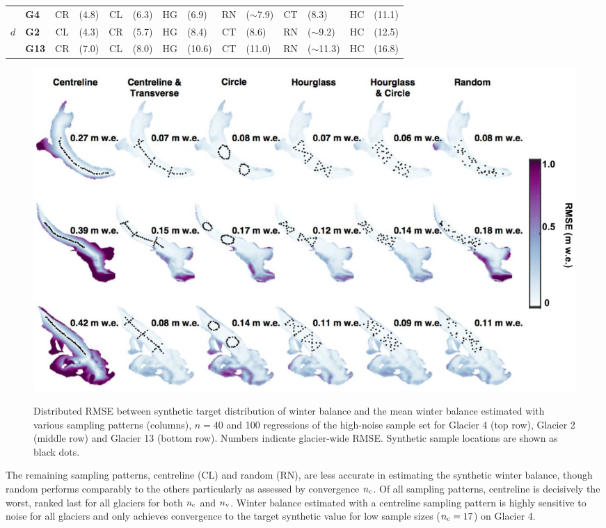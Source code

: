 \documentclass{article}
\begin{document}
\begin{table}[]
\begin{tabular}{clclclclclclcl}
\hline
                & \textbf{G4}   & \textcolor{CR}{CR}         & (4.8) & \textcolor{CL}{CL}         & (6.3) & \textcolor{HG}{HG}                 & (6.9)         & \textcolor{RN}{RN}         & ($\sim$7.9) & \textcolor{CT}{CT}         & (8.3) & \textcolor{HC}{HC} & (11.1) \\
$d$        & \textbf{G2}   & \textcolor{CL}{CL}         & (4.3) & \textcolor{CR}{CR}         & (5.7) & \textcolor{HG}{HG}                 & (8.4)         & \textcolor{CT}{CT} & (8.6)         & \textcolor{RN}{RN}                 & ($\sim$9.2) & \textcolor{HC}{HC} & (12.5) \\
                & \textbf{G13} & \textcolor{CR}{CR}         & (7.0) & \textcolor{CL}{CL}         & (8.0) & \textcolor{HG}{HG}                 & (10.6)         & \textcolor{CT}{CT} & (11.0)         & \textcolor{RN}{RN}                 & ($\sim$11.3) & \textcolor{HC}{HC} & (16.8)\\
\hline
\end{tabular}
\end{table}


\begin{figure}
	\centering
	\includegraphics[width =\textwidth]{Pulwicki_Fig4.pdf}\\
	\caption{Distributed RMSE between synthetic target distribution of winter balance and the mean winter balance estimated with various sampling patterns (columns), $n=40$ and 100 regressions of the high-noise sample set for Glacier 4 (top row), Glacier 2 (middle row) and Glacier 13 (bottom row). Numbers indicate glacier-wide RMSE. Synthetic sample locations are shown as black dots.}
	\label{fig:SynObsRMSEmap}
\end{figure}


The remaining sampling patterns, centreline (CL) and random (RN), are less accurate in estimating the synthetic winter balance, though random performs comparably to the others particularly as assessed by convergence $n_{\rm c}$. 
Of all sampling patterns, centreline is decisively the worst, ranked last for all glaciers for both $n_{\rm c}$ and $n_{\rm v}$. Winter balance estimated with a centreline sampling pattern is highly sensitive to noise for all glaciers and only achieves convergence to the target synthetic value for low sample sizes ($n_{\rm c}=17$) on Glacier 4. 
\end{document}
